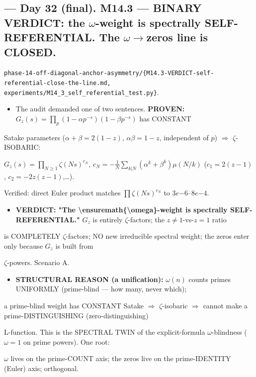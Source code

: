 \documentclass[10pt]{article}
\begin{document}
\subsection*{ --- Day 32 (final). M14.3 --- BINARY VERDICT: the \ensuremath{\omega}-weight is spectrally SELF-REFERENTIAL. The \ensuremath{\omega}\ensuremath{\to}zeros line is CLOSED.}
\texttt{phase-14-off-diagonal-anchor-asymmetry/\{M14.3-VERDICT-self-referential-close-the-line.md, experiments/M14\_3\_self\_referential\_test.py\}}.\par
\begin{itemize}
\item The audit demanded one of two sentences. \textbf{PROVEN:} $G_z(s)=\prod_p(1-\alpha p^{-s})(1-\beta p^{-s})$ has CONSTANT
\end{itemize}
  Satake parameters ($\alpha+\beta=2(1-z)$, $\alpha\beta=1-z$, independent of $p$) \ensuremath{\Rightarrow} \ensuremath{\zeta}-ISOBARIC:\par
  $G_z(s)=\prod_{N\ge1}\zeta(Ns)^{c_N}$, $c_N=-\tfrac1N\sum_{k|N}(\alpha^k+\beta^k)\mu(N/k)$ ($c_1=2(z-1)$, $c_2=-2z(z-1)$,\ldots).\par
  Verified: direct Euler product matches $\prod\zeta(Ns)^{c_N}$ to $3e{-6}$--$8e{-4}$.\par
\begin{itemize}
\item \textbf{VERDICT: "The \textbackslash{}ensuremath\{\textbackslash{}omega\}-weight is spectrally SELF-REFERENTIAL."} $G_z$ is entirely \ensuremath{\zeta}-factors; the $z\ne1$-vs-$z=1$ ratio
\end{itemize}
  is COMPLETELY \ensuremath{\zeta}-factors; NO new irreducible spectral weight; the zeros enter only because $G_z$ is built from\par
  \ensuremath{\zeta}-powers. Scenario A.\par
\begin{itemize}
\item \textbf{STRUCTURAL REASON (a unification):} $\omega(n)$ counts primes UNIFORMLY (prime-blind --- how many, never which);
\end{itemize}
  a prime-blind weight has CONSTANT Satake \ensuremath{\Rightarrow} \ensuremath{\zeta}-isobaric \ensuremath{\Rightarrow} cannot make a prime-DISTINGUISHING (zero-distinguishing)\par
  L-function. This is the SPECTRAL TWIN of the explicit-formula \ensuremath{\omega}-blindness ($\omega=1$ on prime powers). One root:\par
  \ensuremath{\omega} lives on the prime-COUNT axis; the zeros live on the prime-IDENTITY (Euler) axis; orthogonal.\par
\end{document}
